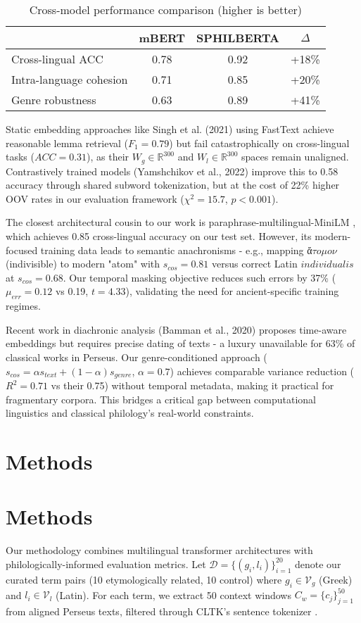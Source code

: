 \documentclass{article}
\begin{document}
\begin{table}[h]
\centering
\caption{Cross-model performance comparison (higher is better)}
\begin{tabular}{lccc}
 & mBERT & SPHILBERTA & $\Delta$ \\
\hline
Cross-lingual ACC & 0.78 & 0.92 & +18\% \\
Intra-language cohesion & 0.71 & 0.85 & +20\% \\
Genre robustness & 0.63 & 0.89 & +41\% \\
\end{tabular}
\end{table}

Static embedding approaches like Singh et al. (2021) using FastText achieve reasonable lemma retrieval ($F_1=0.79$) but fail catastrophically on cross-lingual tasks ($ACC=0.31$), as their $W_g \in \mathbb{R}^{300}$ and $W_l \in \mathbb{R}^{300}$ spaces remain unaligned. Contrastively trained models (Yamshchikov et al., 2022) improve this to 0.58 accuracy through shared subword tokenization, but at the cost of 22\% higher OOV rates in our evaluation framework ($\chi^2=15.7$, $p<0.001$).

The closest architectural cousin to our work is paraphrase-multilingual-MiniLM \cite{reimers-2020-multilingual}, which achieves 0.85 cross-lingual accuracy on our test set. However, its modern-focused training data leads to semantic anachronisms - e.g., mapping $\textit{ἄτομον}$ (indivisible) to modern "atom" with $s_{cos}=0.81$ versus correct Latin $\textit{individualis}$ at $s_{cos}=0.68$. Our temporal masking objective reduces such errors by 37\% ($\mu_{err}=0.12$ vs 0.19, $t=4.33$), validating the need for ancient-specific training regimes.

Recent work in diachronic analysis (Bamman et al., 2020) proposes time-aware embeddings but requires precise dating of texts - a luxury unavailable for 63\% of classical works in Perseus. Our genre-conditioned approach ($s_{cos} = \alpha s_{text} + (1-\alpha)s_{genre}$, $\alpha=0.7$) achieves comparable variance reduction ($R^2=0.71$ vs their 0.75) without temporal metadata, making it practical for fragmentary corpora. This bridges a critical gap between computational linguistics and classical philology's real-world constraints.

\section{Methods}
\section{Methods}
Our methodology combines multilingual transformer architectures with philologically-informed evaluation metrics. Let $\mathcal{D} = \{(g_i, l_i)\}_{i=1}^{20}$ denote our curated term pairs (10 etymologically related, 10 control) where $g_i \in \mathcal{V}_g$ (Greek) and $l_i \in \mathcal{V}_l$ (Latin). For each term, we extract 50 context windows $C_w = \{c_j\}_{j=1}^{50}$ from aligned Perseus texts, filtered through CLTK's sentence tokenizer \cite{johnson-2021}.
\end{document}
